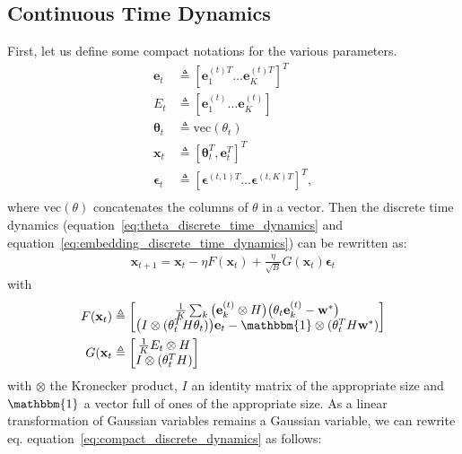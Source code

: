 \documentclass{article} \usepackage{iclr2021_conference,times}
\def\eqref#1{equation~\ref{#1}}
\begin{document}
\subsection{Continuous Time Dynamics} \label{sec:continuous_time_dynamics}
First, let us define some compact notations for the various parameters.
\begin{align}
    \mathbf{e}_t &\triangleq [\mathbf{e}^{(t)T}_1 \hdots \mathbf{e}^{(t)T}_K]^T\\
    E_t &\triangleq [\mathbf{e}^{(t)}_1 \hdots \mathbf{e}^{(t)}_K]\\
    \boldsymbol{\theta}_t &\triangleq \text{vec}(\theta_t) \\
    \mathbf{x}_t &\triangleq [\boldsymbol{\theta}_t^T, \mathbf{e}_t^T]^T\\
    \boldsymbol{\epsilon}_t &\triangleq [\boldsymbol{\epsilon}^{(t,1)T} \hdots \boldsymbol{\epsilon}^{(t,K)T}]^T,\\
\end{align}
where $\text{vec}(\theta)$ concatenates the columns of $\theta$ in a vector. Then the discrete time dynamics (\eqref{eq:theta_discrete_time_dynamics} and \eqref{eq:embedding_discrete_time_dynamics}) can be rewritten as: 
\begin{align}\label{eq:compact_discrete_dynamics}
    \mathbf{x}_{t+1} = \mathbf{x}_t - \eta F(\mathbf{x}_t) + \frac{\eta}{\sqrt{B}} G(\mathbf{x}_t) \boldsymbol{\epsilon}_t
\end{align}
with 
\begin{align}
    F(\mathbf{x}_t) &\triangleq \begin{bmatrix}
 \frac{1}{K}\sum_k \big(\mathbf{e}_k^{(t)}\otimes H\big)\big(\theta_t \mathbf{e}_k^{(t)} - \mathbf{w}^*\big) \\
\big(I \otimes (\theta_t^TH\theta_t)\big)\mathbf{e}_t - \mathbbm{1}\otimes (\theta_t^TH\mathbf{w}^*)
\end{bmatrix} \\
G(\mathbf{x}_t &\triangleq \begin{bmatrix}
\frac{1}{K}E_t \otimes H \\
I \otimes (\theta_t^T H)
\end{bmatrix} \\
\end{align}
with $\otimes$ the Kronecker product, $I$ an identity matrix of the appropriate size and $\mathbbm{1}$ a vector full of ones of the appropriate size. As a linear transformation of Gaussian variables remains a Gaussian variable, we can rewrite eq. \eqref{eq:compact_discrete_dynamics} as follows:
\end{document}
